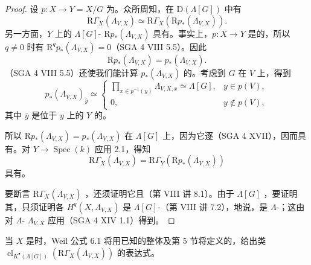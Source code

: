 \begin{proof}
设 $p:X\longrightarrow Y=X/G$ 为。众所周知，在 $\mathrm D(\Lambda[G])$ 中有
\[
\mathrm R\Gamma_X(\Lambda_{V,X})\simeq
\mathrm R\Gamma_X(\mathrm Rp_*(\Lambda_{V,X})).
\]
另一方面，$Y$ 上的 $\Lambda[G]$- $\mathrm Rp_*(\Lambda_{V,X})$ 具有。事实上，$p:X\longrightarrow Y$ 是的，所以 $q\ne0$ 时有 $\mathrm R^qp_*(\Lambda_{V,X})=0$（SGA 4 VIII 5.5）。因此
\[
\mathrm Rp_*(\Lambda_{V,X})=p_*(\Lambda_{V,X}).
\]
（SGA 4 VIII 5.5）还使我们能计算 $p_*(\Lambda_{V,X})$ 的。考虑到 $G$ 在 $V$ 上，得到
\[
p_*(\Lambda_{V,X})_{\bar y}\simeq
\begin{cases}
\displaystyle\prod_{x\in p^{-1}(y)}\Lambda_{V,X,x}\simeq\Lambda[G],&y\in p(V),\\
0,&y\notin p(V),
\end{cases}
\]
其中 $\bar y$ 是位于 $y$ 上的 $Y$ 的。

所以 $\mathrm Rp_*(\Lambda_{V,X})=p_*(\Lambda_{V,X})$ 在 $\Lambda[G]$ 上，因为它逐（SGA 4 XVII），因而具有。对 $Y\longrightarrow\operatorname{Spec}(k)$ 应用 2.1，得知
\[
\mathrm R\Gamma_X(\Lambda_{V,X})=
\mathrm R\Gamma_Y(\mathrm Rp_*(\Lambda_{V,X}))
\]
具有。

要断言 $\mathrm R\Gamma_X(\Lambda_{V,X})$ ，还须证明它且（第 VIII 讲 8.1）。由于 $\Lambda[G]$ ，要证明其，只须证明各 $H^q(X,\Lambda_{V,X})$ 是 $\Lambda[G]$-（第 VIII 讲 7.2），地说，是 $\Lambda$-；这由对 $\Lambda$- $\Lambda_{V,X}$ 应用（SGA 4 XIV 1.1）得到。
\end{proof}

当 $X$ 是时，Weil 公式 6.1 将用已知的整体及第 5 节将定义的，给出类
$\operatorname{cl}_{K^\bullet(\Lambda[G])}(\mathrm R\Gamma_X(\Lambda_{V,X}))$ 的表达式。

